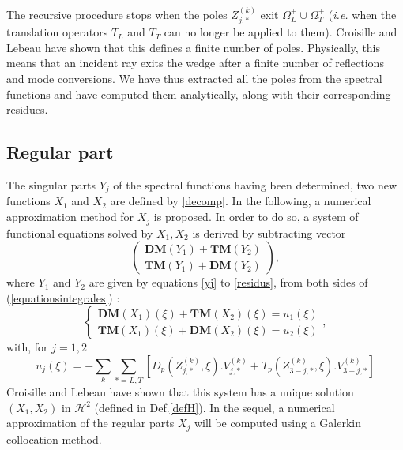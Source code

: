 The recursive procedure stops when the poles $Z_{j,*}^{(k)}$ exit $\Omega_L^+\cup\Omega_T^+$ (\textit{i.e.} when the translation operators $T_L$ and $T_T$ can no longer be applied to them). Croisille and Lebeau \cite{CroisilleLebeau} have shown that this defines a finite number of poles. Physically, this means that an incident ray exits the wedge after a finite number of reflections and mode conversions. We have thus extracted all the poles from the spectral functions and have computed them analytically, along with their corresponding residues. 

\subsection{Regular part}
\label{C3:regpart}
The singular parts $Y_j$ of the spectral functions having been determined, two new functions $X_1$ and $X_2$ are defined by \eqref{decomp}. In the following, a numerical approximation method for $X_j$ is proposed. In order to do so, a system of functional equations solved by $X_1, X_2$ is derived by subtracting vector
\begin{equation}
\begin{pmatrix}
\textbf{DM}(Y_1)+\textbf{TM}(Y_2) \\
\textbf{TM}(Y_1)+\textbf{DM}(Y_2)
\end{pmatrix},
\end{equation}
where $Y_1$ and $Y_2$ are given by equations \eqref{yj} to \eqref{residus}, from both sides of (\ref{equationsintegrales}) :
\begin{equation}
\left\{ 
\begin{matrix}
\textbf{DM}(X_1)(\xi)+\textbf{TM}(X_2)(\xi)=u_1(\xi)\\
\textbf{TM}(X_1)(\xi)+\textbf{DM}(X_2)(\xi)=u_2(\xi)
\end{matrix}
\right.,
\label{regparteqn}
\end{equation}
with, for $j=1,2$
\begin{equation}
u_j(\xi)=-\sum_k \sum_{*=L,T} \left[ D_p(Z_{j,*}^{(k)},\xi).V_{j,*}^{(k)}+T_p(Z_{3-j,*}^{(k)},\xi).V_{3-j,*}^{(k)}\right]
\label{scndmembre}
\end{equation}
Croisille and Lebeau \cite{CroisilleLebeau} have shown that this system has a unique solution $(X_1,X_2)$ in $\mathcal{H}^2$ (defined in Def.\ref{defH}). In the sequel, a numerical approximation of the regular parts $X_j$ will be computed using a Galerkin collocation method.

